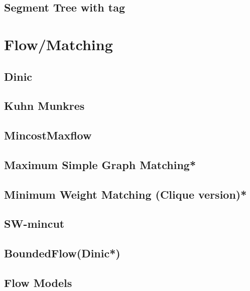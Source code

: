 \subsection{Segment Tree with tag}



\section{Flow/Matching}
\subsection{Dinic}

\subsection{Kuhn Munkres}

\subsection{MincostMaxflow}

\subsection{Maximum Simple Graph Matching*} %

\subsection{Minimum Weight Matching (Clique version)*} %

\subsection{SW-mincut}

\subsection{BoundedFlow(Dinic*)} %

\subsection{Flow Models}

% 


